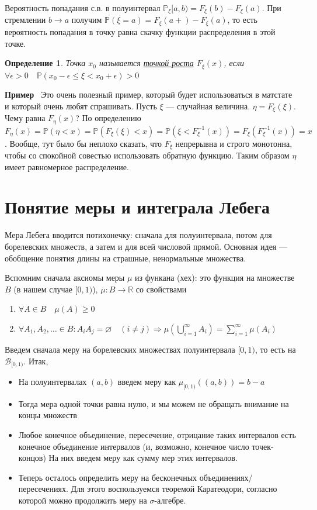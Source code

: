\documentclass[12pt]{article}
\newtheorem{Def}{Определение}
\newenvironment{Ex}{{\bf Пример}\ }{}
\numberwithin{Th}{section}
\numberwithin{Def}{section}
\numberwithin{Lem}{section}
\numberwithin{St}{section}
\numberwithin{equation}{section}
\newcommand\Pro{\mathbb{P}} %
\newcommand\Bor{\mathscr{B}} %
\newcommand\Real{\mathbb{R}} %
\begin{document}
Вероятность попадания с.в. в полуинтервал $\Pro_\xi[a,b) = F_\xi(b) - F_\xi(a)$. При стремлении $b \to a$ получим $\Pro(\xi = a) = F_\xi(a+) - F_\xi(a)$, то есть 
вероятность попадания в точку равна скачку функции распределения в этой точке.

\begin{Def}
Точка $x_0$ называется \underline{точкой роста} $F_\xi(x)$, если $\forall \epsilon > 0 \quad \Pro(x_0 - \epsilon \le \xi < x_0 + \epsilon) > 0$
\end{Def}
\begin{Ex}
Это очень полезный пример, который будет использоваться в матстате и который очень любят спрашивать. Пусть $\xi$ --- случайная величина. $\eta = F_\xi(\xi)$. Чему равна
$F_\eta(x)$? По определению $F_\eta(x) = \Pro(\eta < x) = \Pro(F_\xi(\xi) < x)=\Pro(\xi < F_\xi^{-1}(x)) = F_\xi(F_\xi^{-1}(x))=x$. Вообще, тут было бы неплохо 
сказать, что $F_\xi$ непрерывна и строго монотонна, чтобы со спокойной совестью использовать обратную функцию. Таким образом $\eta$ имеет равномерное распределение.
\end{Ex}

\newpage

\section{Понятие меры и интеграла Лебега}

\qquad Мера Лебега вводится потихонечку: сначала для полуинтервала, потом для борелевских множеств, а затем и для всей числовой прямой. Основная идея --- обобщение
понятия длины на страшные, ненормальные множества.

Вспомним сначала аксиомы меры $\mu$ из функана (хех): это функция на множестве $B$ (в нашем случае $[0, 1)$), $\mu \colon B \to \Real$ со свойствами
\begin{enumerate}
	\item $\forall A \in B \quad \mu(A) \ge 0$
	\item $\forall A_1, A_2, \ldots \in B \colon A_iA_j = \varnothing \quad (i \not= j) \Rightarrow \mu(\bigcup\limits_{i=1}^\infty A_i) = \sum\limits_{i=1}^\infty \mu(A_i)$
\end{enumerate} 

Введем сначала меру на борелевских множествах полуинтервала $[0, 1)$, то есть на $\Bor_{[0, 1)}$. Итак, 
\begin{itemize}
	\item На полуинтервалах $(a, b)$ введем меру как $\mu_{[0, 1)}((a, b)) = b - a$
	\item Тогда мера одной точки равна нулю, и мы можем не обращать внимание на концы множеств
	\item Любое конечное объединение, пересечение, отрицание таких интервалов есть конечное объединение интервалов (и, возможно, конечное число точек-концов)
	На них введем меру как сумму мер этих интервалов.
	\item Теперь осталось определить меру на бесконечных объединениях/пересечениях. Для этого воспользуемся теоремой Каратеодори, согласно которой можно продолжить
	меру на $\sigma$-алгебре.
\end{itemize}
\end{document}
